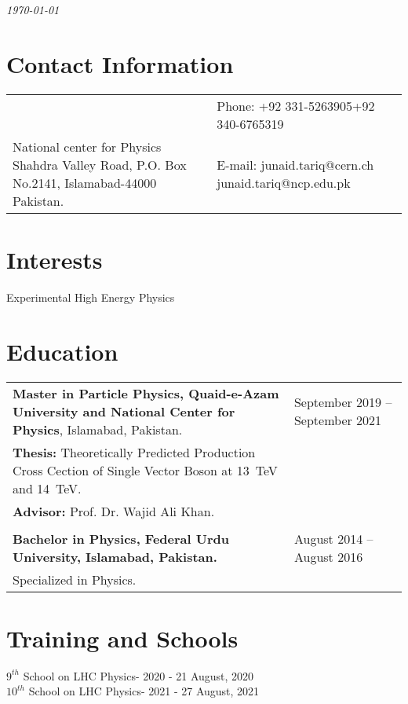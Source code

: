 \documentclass[margin,line]{res}
\begin{document}
 \hfill {\em \today}

\begin{resume}
\section{\sc Contact Information}

\vspace{.05in}
\begin{tabular}{@{}p{3.5in}p{3in}} 
            & {Phone:}  +92 331-5263905\newline  +92 340-6765319 \\
National center for Physics \newline
Shahdra Valley Road, \newline
P.O. Box No.2141, Islamabad-44000\newline 
Pakistan. & {E-mail:}  junaid.tariq@cern.ch \newline junaid.tariq@ncp.edu.pk\\
\end{tabular}


\section{\sc Interests}

Experimental High Energy Physics

\section{\sc Education}
\begin{tabular}{p{8cm}p{8cm}}


{\bf Master in Particle Physics, Quaid-e-Azam University and National Center for Physics}, Islamabad, Pakistan. &September 2019 -- September 2021\\

{\bf Thesis:} Theoretically Predicted Production Cross Cection of Single Vector Boson at 13~TeV and 14~TeV.&\\
{\bf Advisor:} Prof. Dr. Wajid Ali Khan.\\
&\\
{\bf Bachelor in Physics, Federal Urdu University, Islamabad, Pakistan.} \hfill & August 2014 -- August 2016\\
Specialized in Physics.&\\

\end{tabular}
\section{\sc Training and Schools}
$9^{th}$ School on LHC Physics- 2020  - 21 August, 2020\\
$10^{th}$ School on LHC Physics- 2021  - 27 August, 2021\\

\end{resume}
\end{document}
